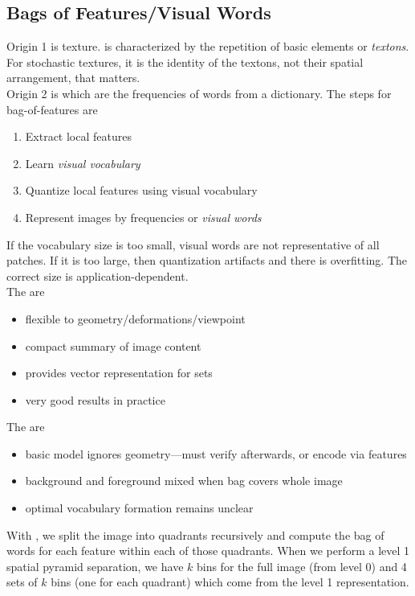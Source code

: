 \documentclass{article}
\begin{document}
\subsection{Bags of Features/Visual Words}

Origin 1 is texture.  is characterized by the repetition of basic elements or \emph{textons}. For stochastic textures, it is the identity of the textons, not their spatial arrangement, that matters. \\ 

Origin 2 is  which are the frequencies of words from a dictionary. The steps for bag-of-features are 
\begin{enumerate}
  \item Extract local features 
  \item Learn \emph{visual vocabulary}
  \item Quantize local features using visual vocabulary 
  \item Represent images by frequencies or \emph{visual words}
\end{enumerate}

If the vocabulary size is too small, visual words are not representative of all patches. If it is too large, then quantization artifacts and there is overfitting. The correct size is application-dependent. \\

The  are
\begin{itemize}
  \item flexible to geometry/deformations/viewpoint 
  \item compact summary of image content 
  \item provides vector representation for sets 
  \item very good results in practice
\end{itemize}
The  are
\begin{itemize}
  \item basic model ignores geometry---must verify afterwards, or encode via features 
  \item background and foreground mixed when bag covers whole image 
  \item optimal vocabulary formation remains unclear
\end{itemize}

With , we split the image into quadrants recursively and compute the bag of words for each feature within each of those quadrants. When we perform a level 1 spatial pyramid separation, we have $k$ bins for the full image (from level 0) and 4 sets of $k$ bins (one for each quadrant) which come from the level 1 representation. 
\end{document}
